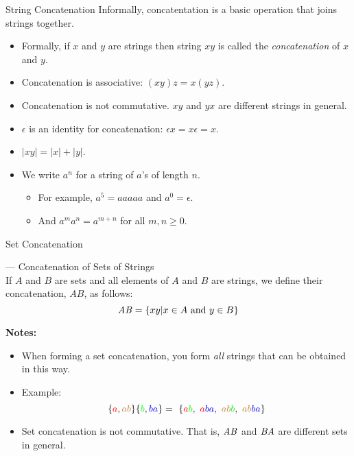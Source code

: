 \begin{slide}[bm=,toc=]{String Concatenation}
Informally, concatentation is a basic operation that joins strings together.

\begin{itemize}
    \item<2-> Formally, if $x$ and $y$ are strings then string $xy$ is called the
          \emph{concatenation} of $x$ and $y$.
    \item<3-> Concatenation is associative: $(xy)z = x(yz)$. 
    \item<4-> Concatenation is not commutative. $xy$ and $yx$ are different strings
    in general.
    \item<5-> $\epsilon$ is an identity for concatenation: ${\epsilon}x = x\epsilon = x$. 
    \item<6-> $|xy| = |x| + |y|$. 
    \item<7-> We write $a^n$ for a string of $a$'s of length $n$.
    \begin{itemize}
        \item<8-> For example, $a^5 = aaaaa$ and $a^0 = \epsilon$. 
        \item<9-> And $a^ma^n = a^{m+n}$ for all $m,n \geq 0.$
    \end{itemize} 
\end{itemize} 
\end{slide}

\begin{slide}[bm=,toc=]{Set Concatenation}
\begin{defn}{--- Concatenation of Sets of Strings}~\\
\pause If $A$ and $B$ are sets and all elements of $A$ and $B$ are strings, we define their concatenation, $AB$, as follows: 
\pause
\[
\mathit{AB} = \{xy | x \in A \text{ and } y \in B\}
\] 
\end{defn}
\pause
\textbf{Notes:}
\begin{itemize}
   \item<4-> When forming a set concatenation, you form \emph{all} strings that can be obtained in this way.
   \item<5-> Example:
   \[\{\textcolor{red}{a},\textcolor{brown}{ab}\}\{\textcolor{green}{b},\textcolor{blue}{ba}\} = \
                      \{\textcolor{red}{a}\textcolor{green}{b}, \
                        \textcolor{red}{a}\textcolor{blue}{ba}, \
                        \textcolor{brown}{ab}\textcolor{green}{b}, \
                        \textcolor{brown}{ab}\textcolor{blue}{ba}\}
   \]
    \vspace{-5mm}
    \item<6-> Set concatenation is not commutative. That is, $\mathit{AB}$ and $\mathit{BA}$ are different sets in general.
\end{itemize} 
\end{slide}


